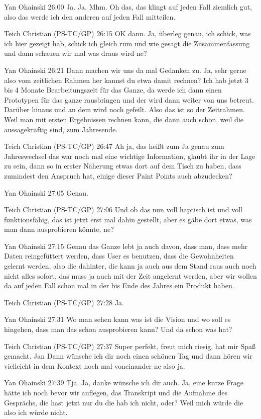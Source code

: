 Yan Ohainski   26:00
Ja.
Ja.
Mhm.
Oh das, das klingt auf jeden Fall ziemlich gut, also das werde ich den anderen auf jeden Fall mitteilen.

Teich Christian (PS-TC/GP)   26:15
OK dann.
Ja, überleg genau, ich schick, was ich hier gezeigt hab, schick ich gleich rum und wie gesagt die Zusammenfassung und dann schauen wir mal was draus wird ne?

Yan Ohainski   26:21
Dann machen wir uns da mal Gedanken zu.
Ja, sehr gerne also vom zeitlichen Rahmen her kannst du etwa damit rechnen? Ich hab jetzt 3 bis 4 Monate Bearbeitungszeit für das Ganze, da werde ich dann einen Prototypen für das ganze rausbringen und der wird dann weiter von uns betreut. Darüber hinaus und an dem wird noch gefeilt. Also das ist so der Zeitrahmen.
Weil man mit ersten Ergebnissen rechnen kann, die dann auch schon, weil die aussagekräftig sind, zum Jahresende.

Teich Christian (PS-TC/GP)   26:47
Ah ja, das heißt zum Ja genau zum Jahreswechsel das war noch mal eine wichtige Information, glaubt ihr in der Lage zu sein, dann so in erster Näherung etwas dort auf dem Tisch zu haben, dass zumindest den Anspruch hat, einige dieser Paint Points auch abzudecken?

Yan Ohainski   27:05
Genau.

Teich Christian (PS-TC/GP)   27:06
Und ob das nun voll haptisch ist und voll funktionsfähig, das ist jetzt erst mal dahin gestellt, aber es gäbe dort etwas, was man dann ausprobieren könnte, ne?

Yan Ohainski   27:15
Genau das Ganze lebt ja auch davon, dass man, dass mehr Daten reingefüttert werden, dass User es benutzen, dass die Gewohnheiten gelernt werden, also die dahinter, die kann ja auch aus dem Stand raus auch noch nicht alles sofort, das muss ja auch mit der Zeit angelernt werden, aber wir wollen da auf jeden Fall schon mal in der bis Ende des Jahres ein Produkt haben.

Teich Christian (PS-TC/GP)   27:28
Ja.

Yan Ohainski   27:31
Wo man sehen kann was ist die Vision und wo soll es hingehen, dass man das schon ausprobieren kann? Und da schon was hat?

Teich Christian (PS-TC/GP)   27:37
Super perfekt, freut mich riesig, hat mir Spaß gemacht. Jan Dann wünsche ich dir noch einen schönen Tag und dann hören wir vielleicht in dem Kontext noch mal voneinander ne also ja.

Yan Ohainski   27:39
Tja.
Ja, danke wünsche ich dir auch.
Ja, eine kurze Frage hätte ich noch bevor wir auflegen, das Transkript und die Aufnahme des Gesprächs, die hast jetzt nur du die hab ich nicht, oder? Weil mich würde die also ich würde nicht.

